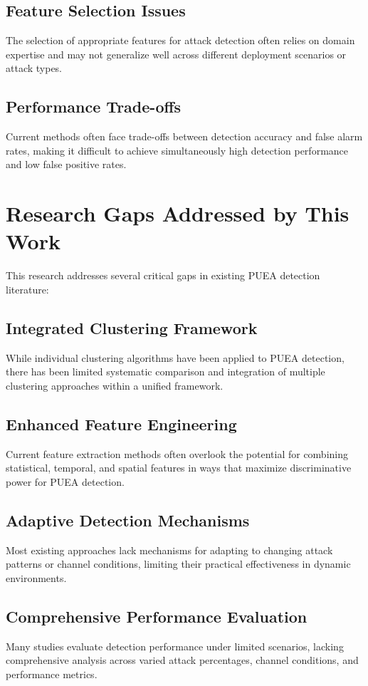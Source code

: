 \subsection{Feature Selection Issues}
The selection of appropriate features for attack detection often relies on domain expertise and may not generalize well across different deployment scenarios or attack types.

\subsection{Performance Trade-offs}
Current methods often face trade-offs between detection accuracy and false alarm rates, making it difficult to achieve simultaneously high detection performance and low false positive rates.

\section{Research Gaps Addressed by This Work}
This research addresses several critical gaps in existing PUEA detection literature:

\subsection{Integrated Clustering Framework}
While individual clustering algorithms have been applied to PUEA detection, there has been limited systematic comparison and integration of multiple clustering approaches within a unified framework.

\subsection{Enhanced Feature Engineering}
Current feature extraction methods often overlook the potential for combining statistical, temporal, and spatial features in ways that maximize discriminative power for PUEA detection.

\subsection{Adaptive Detection Mechanisms}
Most existing approaches lack mechanisms for adapting to changing attack patterns or channel conditions, limiting their practical effectiveness in dynamic environments.

\subsection{Comprehensive Performance Evaluation}
Many studies evaluate detection performance under limited scenarios, lacking comprehensive analysis across varied attack percentages, channel conditions, and performance metrics.

